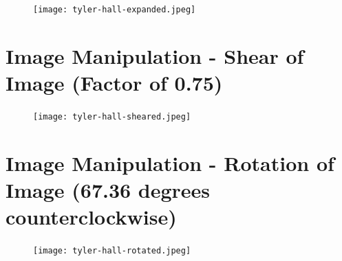 \documentclass{article}
\begin{document}
\begin{figure}[H]
  \centering
  \texttt{[image: tyler-hall-expanded.jpeg]}
  \label{fig3}
\end{figure}

\section*{Image Manipulation - Shear of Image (Factor of 0.75)}

\begin{figure}[H]
  \centering
  \texttt{[image: tyler-hall-sheared.jpeg]}
  \label{fig3}
\end{figure}


\section*{Image Manipulation - Rotation of Image (67.36 degrees counterclockwise)}

\begin{figure}[H]
  \centering
  \texttt{[image: tyler-hall-rotated.jpeg]}
  \label{fig3}
\end{figure}
\end{document}
